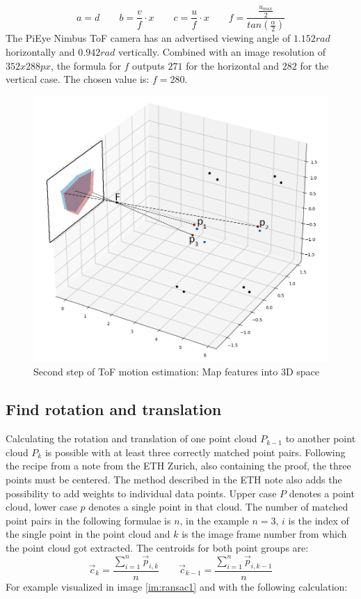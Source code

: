 \begin{equation*}
    a = d \qquad b = \frac{v}{f}\cdot x \qquad c = \frac{u}{f}\cdot x \qquad f=\frac{\tfrac{u_{max}}{2}}{tan(\tfrac{\alpha}{2})}
\end{equation*}
The PiEye Nimbus ToF camera has an advertised viewing angle of $1.152rad$ horizontally and $0.942rad$ vertically. Combined with an image resolution of $352 x 288px$, the formula for $f$ outputs $271$ for the horizontal and $282$ for the vertical case. The chosen value is: $f = 280$.
\begin{figure}[H]
    \centering
    \includegraphics[width=1.0\textwidth]{images/2d_to_3d.png}
    \caption{Second step of ToF motion estimation: Map features into 3D space}
    \label{im:SiftCoordTransform}
\end{figure}
\subsection{Find rotation and translation}
\label{sec:ToFPosition_SVD}
Calculating the rotation and translation of one point cloud $P_{k-1}$ to another point cloud $P_{k}$ is possible with at least three correctly matched point pairs. Following the recipe from a note from the ETH Zurich, also containing the proof, the three points must be centered. The method described in the ETH note also adds the possibility to add weights to individual data points. Upper case $P$ denotes a point cloud, lower case $p$ denotes a single point in that cloud. The number of matched point pairs in the following formulae is $n$, in the example $n = 3$, $i$ is the index of the single point in the point cloud and $k$ is the image frame number from which the point cloud got extracted.
The centroids for both point groups are:
\begin{equation*}
    \vec{c}_{k}=\frac{\sum_{i=1}^n \vec{p}_{i,k}}{n} \qquad 
    \vec{c}_{k-1}=\frac{\sum_{i=1}^n \vec{p}_{i,k-1}}{n} 
\end{equation*}
For example visualized in image \ref{im:ransac1} and with the following calculation:

